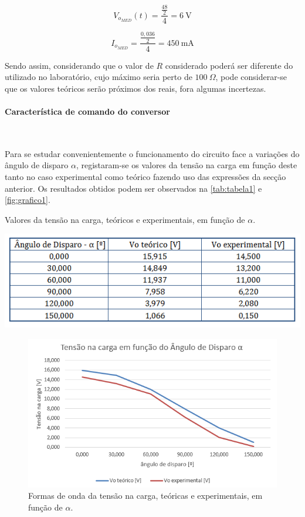 \documentclass[a4paper,11pt]{article}
\numberwithin{equation}{section}
\begin{document}
\[V_{o_{MED}} (t) = \frac{\frac{48}{2}}{4} = 6~\text{V}\]

\[I_{o_{MED}}= \frac{\frac{0,036}{2}}{4} = 450~\text{mA}\]

\vspace{3mm}

Sendo assim, considerando que o valor de $R$ considerado poderá ser diferente do utilizado no laboratório, cujo máximo seria perto de $100~\Omega$, pode considerar-se que os valores teóricos serão próximos dos reais, fora algumas incertezas.

\paragraph{Característica de comando do conversor}\mbox{}\

Para se estudar convenientemente o funcionamento do circuito face a variações do ângulo de disparo $\alpha$, registaram-se os valores da tensão na carga em função deste tanto no caso experimental como teórico fazendo uso das expressões da secção anterior. Os resultados obtidos podem ser observados na \autoref{tab:tabela1} e \autoref{fig:grafico1}. 

\begin{table}[!htb]
	\centering
	\caption{Valores da tensão na carga, teóricos e experimentais, em função de $\alpha$.}
	\vspace{-3mm}
	\includegraphics[width=0.8\linewidth]{teoricas/tabela1}
	\label{tab:tabela1}
\end{table}

\begin{figure}[H]
	\centering
	\includegraphics[keepaspectratio=true, scale=0.8]{teoricas/grafico1}
	\vspace{-3mm}
	\caption{Formas de onda da tensão na carga, teóricas e experimentais, em função de $\alpha$.}
	\label{fig:grafico1}
	\vspace{-0.8em}
\end{figure}
\end{document}
